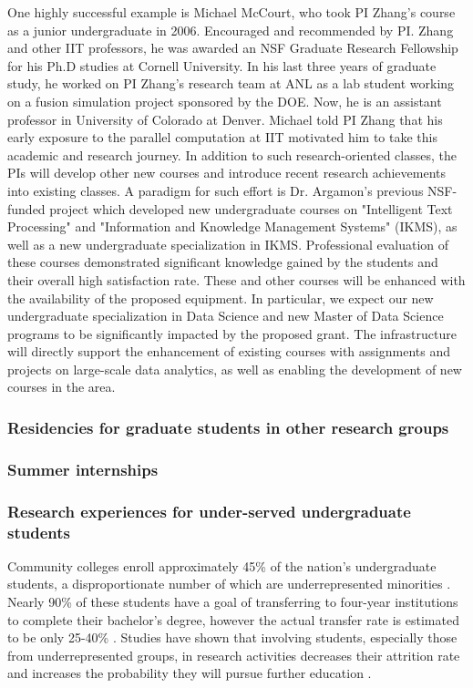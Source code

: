 \documentclass[11pt]{NSFamsart}
\begin{document}
One highly successful example is Michael McCourt, who took PI Zhang's course as a junior undergraduate in 2006. Encouraged and recommended by PI. Zhang and other IIT professors, he was awarded an NSF Graduate Research Fellowship for his Ph.D studies at Cornell University. In his last three years of graduate study, he worked on PI Zhang's research team at ANL as a lab student working on a fusion simulation project sponsored by the DOE. Now, he is an assistant professor in University of Colorado at Denver. Michael told PI Zhang that his early exposure to the parallel computation at IIT motivated him to take this academic and research journey.
In addition to such research-oriented classes, the PIs will develop other new courses and introduce recent research achievements into existing classes. A paradigm for such effort is Dr. Argamon's previous NSF-funded project which developed new undergraduate courses on "Intelligent Text Processing" and "Information and Knowledge Management Systems" (IKMS), as well as a new undergraduate specialization in IKMS. Professional evaluation of these courses demonstrated significant knowledge gained by the students and their overall high satisfaction rate.  These and other courses will be enhanced with the availability of the proposed equipment. In particular, we expect our new undergraduate specialization in Data Science and new Master of Data Science programs to be significantly impacted by the proposed grant. The infrastructure will directly support the enhancement of existing courses with assignments and projects on large-scale data analytics, as well as enabling the development of new courses in the area.



\subsubsection*{Residencies for graduate students in other research groups}
\subsubsection*{Summer internships} 
\subsubsection*{Research experiences for under-served undergraduate students} 
Community colleges enroll approximately 45\% of the nation's undergraduate students, a disproportionate number of which are underrepresented minorities \cite{KnappKG12,nsfreport13}.  Nearly 90\% of these students have a goal of transferring to four-year institutions to complete their bachelor's degree, however the actual transfer rate is estimated to be only 25-40\% \cite{HoachlanderSH03,MelguizoKA11}.  Studies have shown that involving students, especially those from underrepresented groups, in  research activities decreases  their attrition rate and increases the probability they will pursue further education \cite{BarlowV04,JonesBV10}.
\end{document}
